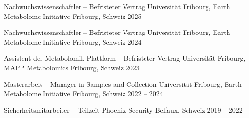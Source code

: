 

\begin{cventries}


\cventry
  {Nachwuchswissenschaftler – Befristeter Vertrag} %
  {Universität Fribourg, Earth Metabolome Initiative} %
  {Fribourg, Schweiz} %
  {2025} %
  {}

\cventry
  {Nachwuchswissenschaftler – Befristeter Vertrag} %
  {Universität Fribourg, Earth Metabolome Initiative} %
  {Fribourg, Schweiz} %
  {2024} %
  {}

\cventry
  {Assistent der Metabolomik-Plattform – Befristeter Vertrag} %
  {Universität Fribourg, MAPP Metabolomics} %
  {Fribourg, Schweiz} %
  {2023} %
  {}

\cventry
  {Masterarbeit – Manager in Samples and Collection} %
  {Universität Fribourg, Earth Metabolome Initiative} %
  {Fribourg, Schweiz} %
  {2022 -- 2024} %
  {}

\cventry
  {Sicherheitsmitarbeiter – Teilzeit} %
  {Phoenix Security} %
  {Belfaux, Schweiz} %
  {2019 -- 2022} %
  {}

\end{cventries}
